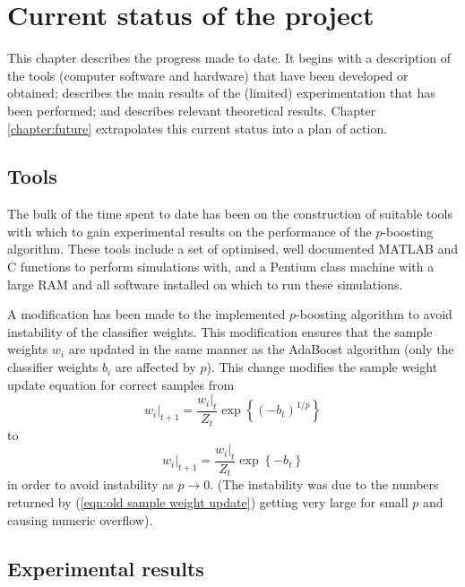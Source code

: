 \chapter{Current status of the project}
\label{chapter:current}

This chapter describes the progress made to date.  It begins with a
description of the tools (computer software and hardware) that have
been developed or obtained; describes the main results of the
(limited) experimentation that has been performed; and describes
relevant theoretical results.  Chapter \ref{chapter:future}
extrapolates this current status into a plan of action.


\section{Tools}

The bulk of the time spent to date has been on the construction of
suitable tools with which to gain experimental results on the
performance of the $p$-boosting algorithm.  These tools include a set
of optimised, well documented MATLAB and C functions to perform
simulations with, and a Pentium class machine with a large RAM and all
software installed on which to run these simulations.

A modification has been made to the implemented $p$-boosting
algorithm to avoid instability of the classifier weights.  This
modification ensures that the sample weights $w_i$ are updated in the
same manner as the AdaBoost algorithm (only the classifier weights
$b_i$ are affected by $p$).  This change modifies the
sample weight update equation for correct samples from 
\begin{equation}
w_i|_{t+1} = \frac{w_i|_t}{Z_t} \exp \left\{ (-b_t)^{1/p} \right\}
\label{eqn:old sample weight update}
\end{equation}
to
\begin{equation}
w_i|_{t+1} = \frac{w_i|_t}{Z_t} \exp \left\{ -b_t \right\}
\label{eqn:new sample weight update}
\end{equation}
in order to avoid instability as $p \rightarrow 0$.  (The instability
was due to the numbers returned by (\ref{eqn:old sample weight update})
getting very large for small $p$ and causing numeric overflow). 


\section{Experimental results}

